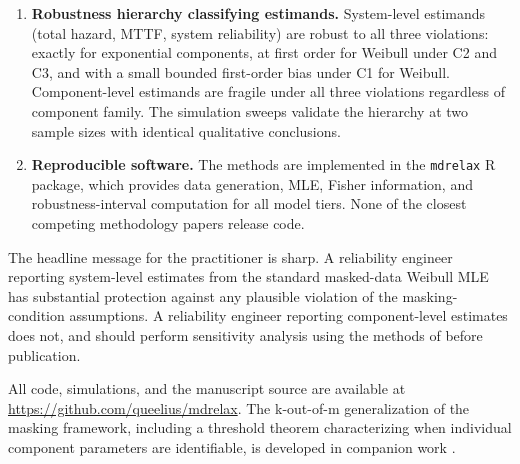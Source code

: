 \begin{enumerate}
    \item \textbf{Robustness hierarchy classifying estimands.}
        System-level estimands (total hazard, MTTF, system reliability)
        are robust to all three violations: exactly for exponential
        components, at first order for Weibull under C2 and C3, and
        with a small bounded first-order bias under C1 for Weibull.
        Component-level estimands are fragile under all three
        violations regardless of component family. The simulation
        sweeps validate the hierarchy at two sample sizes with
        identical qualitative conclusions.

    \item \textbf{Reproducible software.} The methods are implemented
        in the \texttt{mdrelax} R package, which provides data
        generation, MLE, Fisher information, and robustness-interval
        computation for all model tiers. None of the closest competing
        methodology papers release code.
\end{enumerate}

The headline message for the practitioner is sharp. A reliability
engineer reporting system-level estimates from the standard
masked-data Weibull MLE has substantial protection against any
plausible violation of the masking-condition assumptions. A
reliability engineer reporting component-level estimates does not,
and should perform sensitivity analysis using the methods of
 before publication.

All code, simulations, and the manuscript source are available at
\url{https://github.com/queelius/mdrelax}. The k-out-of-m generalization
of the masking framework, including a threshold theorem characterizing
when individual component parameters are identifiable, is developed in
companion work \citep{towell2026binary}.
